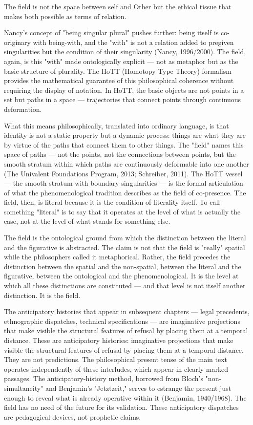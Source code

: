 The field is not the space between self and Other but the ethical tissue that makes both possible as terms of relation.

Nancy's concept of "being singular plural" pushes further: being itself is co-originary with being-with, and the "with" is not a relation added to pregiven singularities but the condition of their singularity (Nancy, 1996/2000). The field, again, is this "with" made ontologically explicit — not as metaphor but as the basic structure of plurality. The HoTT (Homotopy Type Theory) formalism provides the mathematical guarantee of this philosophical coherence without requiring the display of notation. In HoTT, the basic objects are not points in a set but paths in a space — trajectories that connect points through continuous deformation.

What this means philosophically, translated into ordinary language, is that identity is not a static property but a dynamic process: things are what they are by virtue of the paths that connect them to other things. The "field" names this space of paths — not the points, not the connections between points, but the smooth stratum within which paths are continuously deformable into one another (The Univalent Foundations Program, 2013; Schreiber, 2011). The HoTT vessel — the smooth stratum with boundary singularities — is the formal articulation of what the phenomenological tradition describes as the field of co-presence. The field, then, is literal because it is the condition of literality itself. To call something "literal" is to say that it operates at the level of what is actually the case, not at the level of what stands for something else.

The field is the ontological ground from which the distinction between the literal and the figurative is abstracted. The claim is not that the field is "really" spatial while the philosophers called it metaphorical. Rather, the field precedes the distinction between the spatial and the non-spatial, between the literal and the figurative, between the ontological and the phenomenological. It is the level at which all these distinctions are constituted — and that level is not itself another distinction. It is the field.

The anticipatory histories that appear in subsequent chapters — legal precedents, ethnographic dispatches, technical specifications — are imaginative projections that make visible the structural features of refusal by placing them at a temporal distance. These are anticipatory histories: imaginative projections that make visible the structural features of refusal by placing them at a temporal distance. They are not predictions. The philosophical present tense of the main text operates independently of these interludes, which appear in clearly marked passages. The anticipatory-history method, borrowed from Bloch's "non-simultaneity" and Benjamin's "Jetztzeit," serves to estrange the present just enough to reveal what is already operative within it (Benjamin, 1940/1968). The field has no need of the future for its validation. These anticipatory dispatches are pedagogical devices, not prophetic claims.


